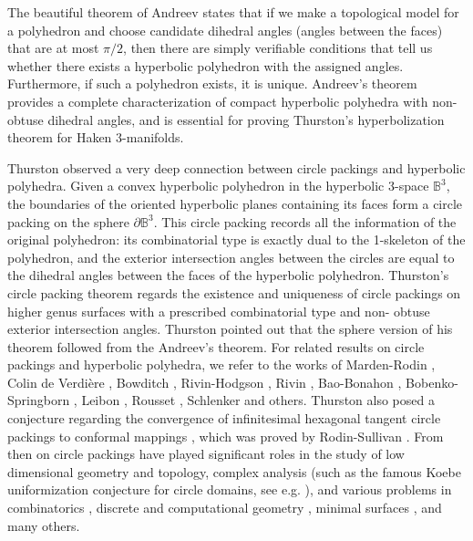 \documentclass[12pt]{amsart}
\numberwithin{equation}{section}
\begin{document}
The beautiful theorem of Andreev \cite{Andreev1,Andreev2} states that if we make a topological model for a polyhedron
and choose candidate dihedral angles (angles between the faces) that are at most $\pi/2$, then there are
simply verifiable conditions that tell us whether there exists a hyperbolic polyhedron with the assigned
angles. Furthermore, if such a polyhedron exists, it is unique. Andreev's theorem provides a complete
characterization of compact hyperbolic polyhedra with non-obtuse dihedral angles, and is essential for
proving Thurston's hyperbolization theorem for Haken 3-manifolds.

Thurston \cite{Thurston} observed a very deep connection between circle packings and hyperbolic polyhedra. Given
a convex hyperbolic polyhedron in the hyperbolic 3-space $\mathbb{B}^3$, the boundaries of the oriented hyperbolic
planes containing its faces form a circle packing on the sphere $\partial \mathbb{B}^3$. This circle packing records all the
information of the original polyhedron: its combinatorial type is exactly dual to the 1-skeleton of the
polyhedron, and the exterior intersection angles between the circles are equal to the dihedral angles
between the faces of the hyperbolic polyhedron. Thurston's circle packing theorem regards the existence
and uniqueness of circle packings on higher genus surfaces with a prescribed combinatorial type and non-
obtuse exterior intersection angles. Thurston pointed out that the sphere version of his theorem followed
from the Andreev's theorem. For related results on circle packings and hyperbolic polyhedra, we refer to
the works of Marden-Rodin \cite{MardenRodin}, Colin de Verdi\`ere \cite{Colin}, Bowditch \cite{Bowditch}, Rivin-Hodgson \cite{RivinHodgson}, Rivin \cite{Rivin1,Rivin2},
Bao-Bonahon \cite{BaoBonahon}, Bobenko-Springborn \cite{BobenkoSpringborn}, Leibon \cite{Leibon}, Rousset \cite{Rousset}, Schlenker \cite{Schlenker}
and others. Thurston also posed a conjecture regarding the convergence of infinitesimal hexagonal tangent circle packings to
conformal mappings \cite{Thurston2}, which was proved by Rodin-Sullivan \cite{RodinSullivan}. From then on circle packings have
played significant roles in the study of low dimensional geometry and topology, complex analysis (such as
the famous Koebe uniformization conjecture for circle domains, see e.g. \cite{HeSchramm1,HeSchramm2,HeSchramm3}), and various problems
in combinatorics \cite{LiuZhou,Schramm1}, discrete and computational geometry \cite{DaiGuLuo,Stephenson}, minimal surfaces \cite{BobenkoHoffmannSpringborn}, and many
others.
\end{document}
